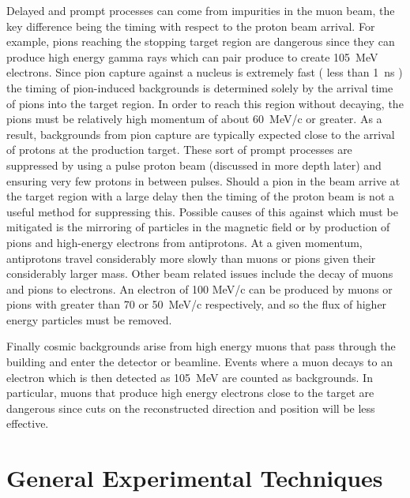 

Delayed and prompt processes can come from impurities in the muon beam, the key difference being the timing with respect to the proton beam arrival.
For example, pions reaching the stopping target region are dangerous since they can produce high energy gamma rays which can pair produce to create 105~MeV electrons.
Since pion capture against a nucleus is extremely fast ( less than 1~ns ) the timing of pion-induced backgrounds is determined solely by the arrival time of pions into the target region.
In order to reach this region without decaying, the pions must be relatively high momentum of about 60~MeV/c or greater.  
As a result, backgrounds from pion capture are typically expected close to the arrival of protons at the production target.
These sort of prompt processes are suppressed by using a pulse proton beam (discussed in more depth later) and ensuring very few protons in between pulses.
Should a pion in the beam arrive at the target region with a large delay then the timing of the proton beam is not a useful method for suppressing this.  
Possible causes of this against which must be mitigated is the mirroring of particles in the magnetic field or by production of pions and high-energy electrons from antiprotons.
At a given momentum, antiprotons travel considerably more slowly than muons or pions given their considerably larger mass.
Other beam related issues include the decay of muons and pions to electrons.
An electron of 100 MeV/c can be produced by muons or pions with greater than 70 or 50~MeV/c respectively, and so the flux of higher energy particles must be removed.

Finally cosmic backgrounds arise from high energy muons that pass through the building and enter the detector or beamline.  
Events where a muon decays to an electron which is then detected as 105~MeV are counted as backgrounds.
In particular, muons that produce high energy electrons close to the target are dangerous since cuts on the reconstructed direction and position will be less effective.

\section{General Experimental Techniques}
